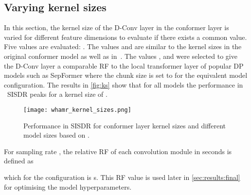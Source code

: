 \subsection{Varying kernel sizes}\label{sec:ks}
In this section, the kernel size  of the \ac{D-Conv} layer in the conformer layer is varied for different feature dimensions  to evaluate if there exists a common  value.
Five  values are evaluated: . The values  and  are similar to the kernel sizes in the original conformer model \cite{conformer} as well as in~\cite{cssconformer, se_conformer}. The values ,  and  were selected to give the \ac{D-Conv} layer a comparable \ac{RF} to the local transformer layer of popular \ac{DP} models such as SepFormer \cite{sepformer} where the chunk size is set to  for the equivalent  model configuration.
The results in \autoref{fig:ks} show that for all models the performance in ~SISDR peaks for a kernel size of .
\begin{figure}[!ht]
    \centering
    \texttt{[image: whamr\_kernel\_sizes.png]}
    \caption{Performance in  SISDR for conformer layer kernel sizes  and different model sizes based on .}
    \label{fig:ks}
\end{figure}
For sampling rate , the relative \ac{RF} of each convolution module in seconds is defined as

which for the configuration   is s. This \ac{RF} value is used later in \autoref{sec:results:final} for optimising the model hyperparameters.


